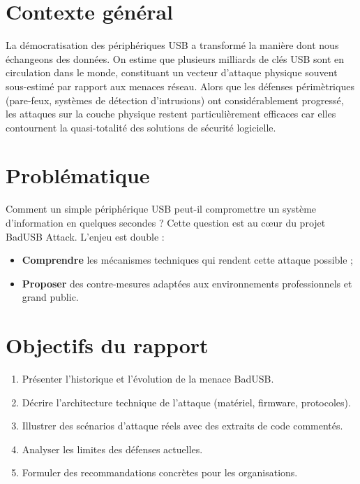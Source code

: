 \documentclass[12pt,a4paper]{report}
\begin{document}
\section{Contexte général}

La démocratisation des périphériques USB a transformé la manière dont nous échangeons des données. On estime que plusieurs milliards de clés USB sont en circulation dans le monde, constituant un vecteur d'attaque physique souvent sous-estimé par rapport aux menaces réseau. Alors que les défenses périmètriques (pare-feux, systèmes de détection d'intrusions) ont considérablement progressé, les attaques sur la couche physique restent particulièrement efficaces car elles contournent la quasi-totalité des solutions de sécurité logicielle.

\section{Problématique}

Comment un simple périphérique USB peut-il compromettre un système d'information en quelques secondes ? Cette question est au c\oe ur du projet BadUSB Attack. L'enjeu est double :

\begin{itemize}
  \item \textbf{Comprendre} les mécanismes techniques qui rendent cette attaque possible ;
  \item \textbf{Proposer} des contre-mesures adaptées aux environnements professionnels et grand public.
\end{itemize}

\section{Objectifs du rapport}

\begin{enumerate}
  \item Présenter l'historique et l'évolution de la menace BadUSB.
  \item Décrire l'architecture technique de l'attaque (matériel, firmware, protocoles).
  \item Illustrer des scénarios d'attaque réels avec des extraits de code commentés.
  \item Analyser les limites des défenses actuelles.
  \item Formuler des recommandations concrètes pour les organisations.
\end{enumerate}
\end{document}
